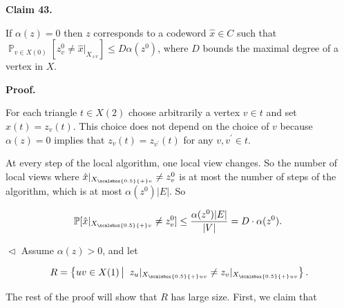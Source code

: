 \documentclass[10pt,a4paper]{article}
\begin{document}


\par\medskip\noindent\textbf{
Claim 43. 
}\par



If $\alpha(z)=0$ then $z$ corresponds to a codeword $\hat{x}\in C$ such that $\operatorname*{\mathbb{P}}_{v\in X(0)}[z_{v}^{0}\not=\hat{x}|_{X_{+v}}]\leq D\alpha(z^{0})$,
where $D$ bounds the maximal degree of a vertex in $X$.\par







\par\medskip\noindent\textbf{
\textbf{Proof}.}\par




For each triangle $t\in X(2)$ choose arbitrarily a vertex $v\in t$ and set $\hat{x}(t)=z_{v}(t)$. This choice does not depend on the choice of $v$ because $\alpha(z)=0$ implies that $z_{v}(t)=z_{v^{\prime}}(t)$ for any $v,v^{\prime}\in t$.\par




At every step of the local algorithm, one local view changes. So the number of local views where $\hat{x}|_{{X}_{\scalebox{0.5}{+}v}}\neq z^{0}_{v}$ is at most the number of steps of the algorithm, which is at most $\alpha(z^{0})|E|$. So\par


\[\begin{gathered}
\operatorname*{\mathbb{P}}[\hat{x}|_{{X}_{\scalebox{0.5}{+}v}}\neq z^{0}_{v}]\leq\frac{\alpha(z^{0})|E|}{|V|}=D\cdot\alpha(z^{0}).\
\end{gathered}\]


$\vartriangleleft$
Assume $\alpha(z)>0$, and let\par


\[\begin{gathered}
R=\left\{uv\in X(1)\left|\;\vphantom{uv\in X(1)z_{u}|_{{X}_{\scalebox{0.5}{+}uv}}\neq z_{v}|_{{X}_{\scalebox{0.5}{+}uv}}}\right.z_{u}|_{{X}_{\scalebox{0.5}{+}uv}}\neq z_{v}|_{{X}_{\scalebox{0.5}{+}uv}}\right\}.
\end{gathered}\]


The rest of the proof will show that $R$ has large size.
First, we claim that\par
\end{document}
